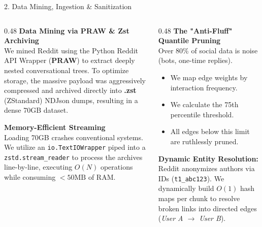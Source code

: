 \documentclass[aspectratio=169, 10pt]{beamer}
\begin{document}
\begin{frame}{2. Data Mining, Ingestion \& Sanitization}
    \begin{columns}[T]
        \begin{column}{0.48\textwidth}
            \textbf{Data Mining via PRAW \& Zst Archiving} \\
            We mined Reddit using the Python Reddit API Wrapper (\textbf{PRAW}) to extract deeply nested conversational trees. To optimize storage, the massive payload was aggressively compressed and archived directly into \textbf{.zst} (ZStandard) NDJson dumps, resulting in a dense 70GB dataset.
            
            \vspace{0.2cm}
            \textbf{Memory-Efficient Streaming} \\
            Loading 70GB crashes conventional systems. We utilize an \texttt{io.TextIOWrapper} piped into a \texttt{zstd.stream\_reader} to process the archives line-by-line, executing $O(N)$ operations while consuming $<50\text{MB}$ of RAM.
        \end{column}
        \begin{column}{0.48\textwidth}
            \textbf{The "Anti-Fluff" Quantile Pruning} \\
            Over 80\% of social data is noise (bots, one-time replies). 
            \begin{itemize}
                \item We map edge weights by interaction frequency.
                \item We calculate the 75th percentile threshold.
                \item All edges below this limit are ruthlessly pruned.
            \end{itemize}
            \vspace{0.2cm}
            \textbf{Dynamic Entity Resolution:} Reddit anonymizes authors via IDs (\texttt{t1\_abc123}). We dynamically build $O(1)$ hash maps per chunk to resolve broken links into directed edges (\textit{User A $\rightarrow$ User B}).
        \end{column}
    \end{columns}
\end{frame}
\end{document}
